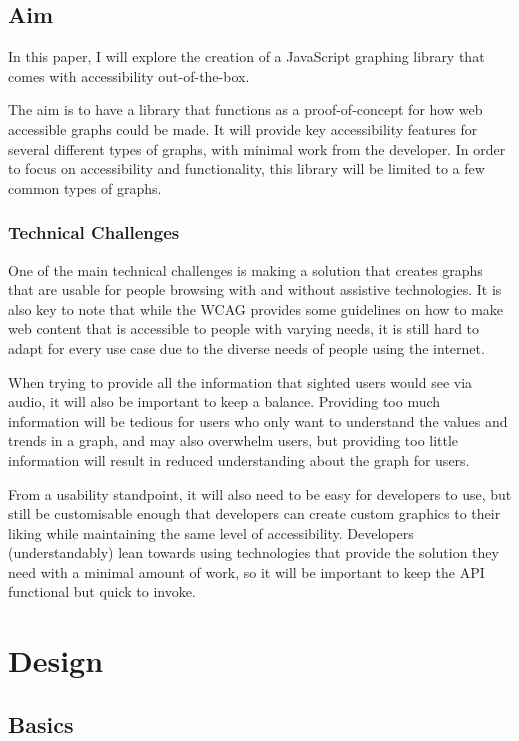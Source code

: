 \documentclass[ %
                    author={Aleena Baig},
                supervisor={Dr Simon Lock},
                    degree={BSc},
                     title={On Making Web Accessible Graphs},
                  subtitle={},
                      year={2019} ]{dissertation}
\begin{document}
\section{Aim}

In this paper, I will explore the creation of a JavaScript graphing library that comes with accessibility out-of-the-box.

The aim is to have a library that functions as a proof-of-concept for how web accessible graphs could be made. It will provide key accessibility features for several different types of graphs, with minimal work from the developer. In order to focus on accessibility and functionality, this library will be limited to a few common types of graphs.

\subsection{Technical Challenges}

One of the main technical challenges is making a solution that creates graphs that are usable for people browsing with and without assistive technologies. It is also key to note that while the WCAG provides some guidelines on how to make web content that is accessible to people with varying needs, it is still hard to adapt for every use case due to the diverse needs of people using the internet.

When trying to provide all the information that sighted users would see via audio, it will also be important to keep a balance. Providing too much information will be tedious for users who only want to understand the values and trends in a graph, and may also overwhelm users, but providing too little information will result in reduced understanding about the graph for users.

From a usability standpoint, it will also need to be easy for developers to use, but still be customisable enough that developers can create custom graphics to their liking while maintaining the same level of accessibility. Developers (understandably) lean towards using technologies that provide the solution they need with a minimal amount of work, so it will be important to keep the API functional but quick to invoke.

\chapter{Design}

\section{Basics}
\end{document}
